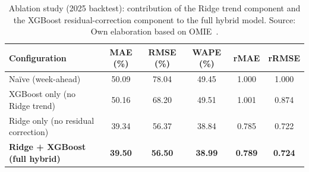 \begin{table}[H]
    \centering
    \caption{Ablation study (2025 backtest): contribution of the Ridge trend component and the XGBoost residual-correction component to the full hybrid model. Source: Own elaboration based on OMIE~\cite{omie2025}.}
    \label{tab:ablation}
    \begin{tabular}{lccccc}
        \toprule
        \textbf{Configuration} & \textbf{MAE (\%)} & \textbf{RMSE (\%)} & \textbf{WAPE (\%)} & \textbf{rMAE} & \textbf{rRMSE} \\
        \midrule
        Naïve (week-ahead) & 50.09 & 78.04 & 49.45 & 1.000 & 1.000 \\
        XGBoost only (no Ridge trend) & 50.16 & 68.20 & 49.51 & 1.001 & 0.874 \\
        Ridge only (no residual correction) & 39.34 & 56.37 & 38.84 & 0.785 & 0.722 \\
        \textbf{Ridge + XGBoost (full hybrid)} & \textbf{39.50} & \textbf{56.50} & \textbf{38.99} & \textbf{0.789} & \textbf{0.724} \\
        \bottomrule
    \end{tabular}
\end{table}